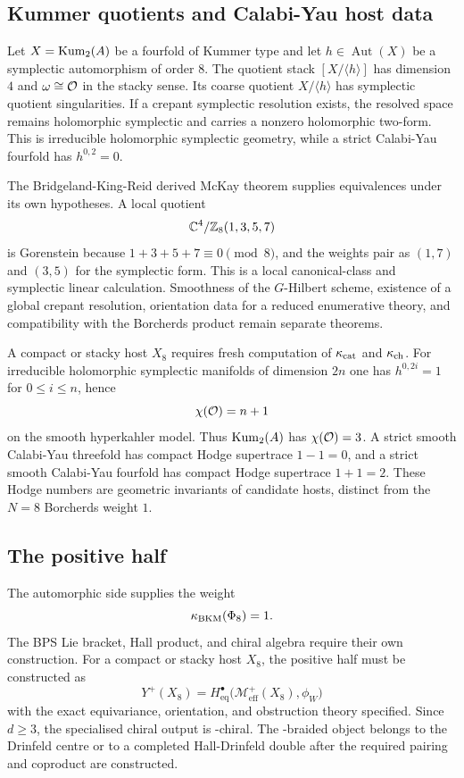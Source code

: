 \subsection*{Kummer quotients and Calabi-Yau host data}

Let $X=\mathrm{Kum}_2(A)$ be a fourfold of Kummer type and let
\(h\in\operatorname{Aut}(X)\) be a symplectic automorphism of order
\(8\). The quotient stack \([X/\langle h\rangle]\) has dimension \(4\)
and \(\omega\cong\mathcal{O}\) in the stacky sense. Its coarse quotient
\(X/\langle h\rangle\) has symplectic quotient singularities. If a
crepant symplectic resolution exists, the resolved space remains
holomorphic symplectic and carries a nonzero holomorphic two-form. This
is irreducible holomorphic symplectic geometry, while a strict
Calabi-Yau fourfold has \(h^{0,2}=0\).

The Bridgeland-King-Reid derived McKay theorem supplies equivalences
under its own hypotheses. A local quotient
\[
  \mathbb{C}^4/\mathbb{Z}_8(1,3,5,7)
\]
is Gorenstein because $1+3+5+7\equiv 0\pmod 8$, and the weights pair as
\((1,7)\) and \((3,5)\) for the symplectic form. This is a local
canonical-class and symplectic linear calculation. Smoothness of the
$G$-Hilbert scheme, existence of a global crepant resolution,
orientation data for a reduced enumerative theory, and compatibility
with the Borcherds product remain separate theorems.

A compact or stacky host \(X_8\) requires fresh computation of
$\kappa_{\mathrm{cat}}$ and $\kappa_{\mathrm{ch}}$. For irreducible holomorphic symplectic manifolds of
dimension $2n$ one has
$h^{0,2i}=1$ for $0\leq i\leq n$, hence
\[
  \chi(\mathcal{O})=n+1
\]
on the smooth hyperkahler model. Thus \(\mathrm{Kum}_2(A)\) has
\(\chi(\mathcal{O})=3\). A strict smooth Calabi-Yau threefold has compact Hodge
supertrace \(1-1=0\), and a strict smooth Calabi-Yau fourfold has
compact Hodge supertrace \(1+1=2\). These Hodge numbers are geometric
invariants of candidate hosts, distinct from the $N=8$ Borcherds weight
\(1\).

\subsection*{The positive half}

The automorphic side supplies the weight
\[
  \kappa_{\mathrm{BKM}}(\Phi_8)=1.
\]
The BPS Lie bracket, Hall product, and chiral algebra require their own
construction. For a compact or stacky host $X_8$, the positive half must
be constructed as
\[
  Y^+(X_8)
  =
  H^\bullet_{\mathrm{eq}}
  \bigl(\mathcal M^+_{\mathrm{eff}}(X_8),\phi_W\bigr)
\]
with the exact equivariance, orientation, and obstruction theory
specified. Since $d\geq 3$, the specialised chiral output is
\Eone-chiral. The \Etwo-braided object belongs to the Drinfeld centre
or to a completed Hall-Drinfeld double after the required pairing and
coproduct are constructed.

